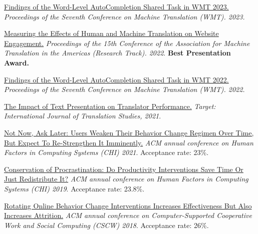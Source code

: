 \href{https://aclanthology.org/2023.wmt-1.53.pdf}{Findings of the Word-Level AutoCompletion Shared Task in WMT 2023.} \emph{Proceedings of the Seventh Conference on Machine Translation (WMT). 2023.}

\href{https://aclanthology.org/2022.amta-research.23.pdf}{Measuring the Effects of Human and Machine Translation on Website Engagement.} \emph{Proceedings of the 15th Conference of the Association for Machine Translation in the Americas (Research Track). 2022}. \textbf{Best Presentation Award.}

\href{https://aclanthology.org/2022.wmt-1.75.pdf}{Findings of the Word-Level AutoCompletion Shared Task in WMT 2022.} \emph{Proceedings of the Seventh Conference on Machine Translation (WMT). 2022.}

\href{https://arxiv.org/pdf/2011.05978.pdf}{The Impact of Text Presentation on Translator Performance.} \emph{Target: International Journal of Translation Studies, 2021}.

\href{https://hci.stanford.edu/publications/2021/notnow/notnowasklater.pdf}{Not Now, Ask Later: Users Weaken Their Behavior Change Regimen Over Time, But Expect To Re-Strengthen It Imminently.} \emph{ACM annual conference on Human Factors in Computing Systems (CHI) 2021}. Acceptance rate: 23\%. %

\href{https://hci.stanford.edu/publications/2019/conservation/conservation-chi2019.pdf}{Conservation of Procrastination: Do Productivity Interventions Save Time Or Just Redistribute It?} \emph{ACM annual conference on Human Factors in Computing Systems (CHI) 2019}. Acceptance rate: 23.8\%. %


\href{https://hci.stanford.edu/publications/2018/habitlab/habitlab-cscw18.pdf}{Rotating Online Behavior Change Interventions Increases Effectiveness But Also Increases Attrition.} \emph{ACM annual conference on Computer-Supported Cooperative Work and Social Computing (CSCW) 2018}. Acceptance rate: 26\%.

